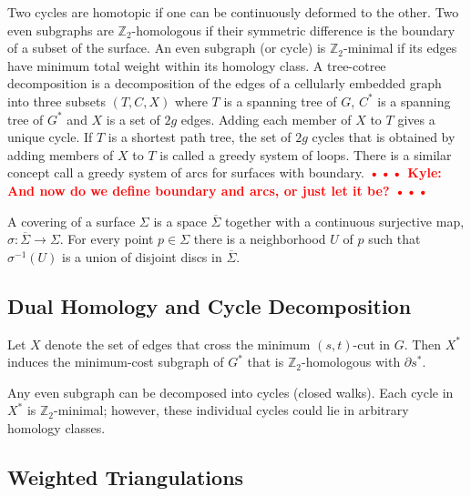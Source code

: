 \documentclass[natbib]{svcyclop}
\def\NOTE#1{\textcolor{Red}{\textbf{\textsf{••• #1 •••}}}}
\def\Z{\mathbb{Z}}
\begin{document}
Two cycles are homotopic if one can be continuously deformed to the other.  
Two even subgraphs are $\mathbb{Z}_2$-homologous if their symmetric difference is the boundary of a subset of the surface.
An even subgraph (or cycle) is $\Z_2$-minimal if its edges have minimum total weight within its homology class.
A tree-cotree decomposition is a decomposition of the edges of a cellularly embedded graph into three subsets $(T, C, X)$ where $T$ is a spanning tree of $G$, $C^*$ is a spanning tree of $G^*$ and $X$ is a set of $2g$ edges.  
Adding each member of $X$ to $T$ gives a unique cycle.  
If $T$ is a shortest path tree, the set of $2g$ cycles that is obtained by adding members of $X$ to $T$ is called a greedy system of loops.
There is a similar concept call a greedy system of arcs for surfaces with boundary.
\NOTE{Kyle: And now do we define boundary and arcs, or just let it be?}

A covering of a surface $\Sigma$ is a space $\overline{\Sigma}$ together with a continuous surjective map, $\sigma: \overline{\Sigma} \rightarrow \Sigma$. For every point $p \in \Sigma$ there is a neighborhood $U$ of $p$ such that $\sigma^{-1}(U)$ is a union of disjoint discs in $\overline{\Sigma}$.


\subsection{Dual Homology and Cycle Decomposition}

Let $X$ denote the set of edges that cross the minimum $(s,t)$-cut in $G$.  Then $X^*$ induces the minimum-cost subgraph of $G^*$ that is $\Z_2$-homologous with $\partial s^*$.

Any even subgraph can be decomposed into cycles (closed walks).  Each cycle in $X^*$ is $\Z_2$-minimal; however, these individual cycles could lie in arbitrary homology classes.


\subsection{Weighted Triangulations}
\end{document}
